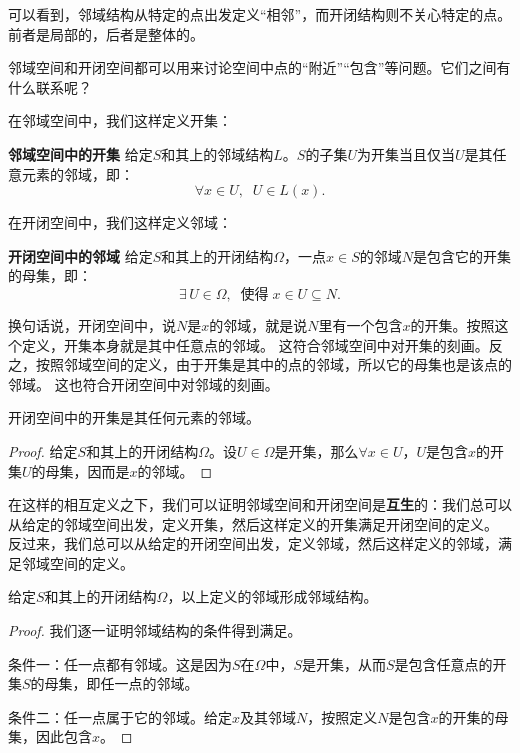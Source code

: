 \documentclass[12pt,UTF8,fontset=none]{ctexbook}
\begin{document}
\begin{appendix}
可以看到，邻域结构从特定的点出发定义“相邻”，而开闭结构则不关心特定的点。前者是局部的，后者是整体的。

邻域空间和开闭空间都可以用来讨论空间中点的“附近”“包含”等问题。它们之间有什么联系呢？

在邻域空间中，我们这样定义开集：
\begin{df}{\textbf{邻域空间中的开集}}\label{df:a-0-2}
    给定$S$和其上的邻域结构$L$。$S$的子集$U$为开集当且仅当$U$是其任意元素的邻域，即：
    $$ \forall x\in U, \;\; U\in L(x).$$
\end{df}

在开闭空间中，我们这样定义邻域：
\begin{df}{\textbf{开闭空间中的邻域}}\label{df:a-0-3}
    给定$S$和其上的开闭结构$\Omega$，一点$x\in S$的邻域$N$是包含它的开集的母集，即：
    $$ \exists\, U \in \Omega, \;\; \mbox{使得}\; x\in U \subseteq N.  $$
\end{df}
换句话说，开闭空间中，说$N$是$x$的邻域，就是说$N$里有一个包含$x$的开集。按照这个定义，开集本身就是其中任意点的邻域。
这符合邻域空间中对开集的刻画。反之，按照邻域空间的定义，由于开集是其中的点的邻域，所以它的母集也是该点的邻域。
这也符合开闭空间中对邻域的刻画。

\begin{tm}\label{tm:a-0-0}
    开闭空间中的开集是其任何元素的邻域。
\end{tm}

\begin{proof}
    给定$S$和其上的开闭结构$\Omega$。设$U\in \Omega$是开集，那么$\forall x\in U$，$U$是包含$x$的开集$U$的母集，因而是$x$的邻域。
\end{proof}

在这样的相互定义之下，我们可以证明邻域空间和开闭空间是\textbf{互生}的：我们总可以从给定的邻域空间出发，定义开集，然后这样定义的开集满足开闭空间的定义。
反过来，我们总可以从给定的开闭空间出发，定义邻域，然后这样定义的邻域，满足邻域空间的定义。

\begin{tm}
    给定$S$和其上的开闭结构$\Omega$，以上定义的邻域形成邻域结构。
\end{tm}

\begin{proof}
    我们逐一证明邻域结构的条件得到满足。

    条件一：任一点都有邻域。这是因为$S$在$\Omega$中，$S$是开集，从而$S$是包含任意点的开集$S$的母集，即任一点的邻域。

    条件二：任一点属于它的邻域。给定$x$及其邻域$N$，按照定义$N$是包含$x$的开集的母集，因此包含$x$。


\end{proof}
\end{appendix}
\end{document}
